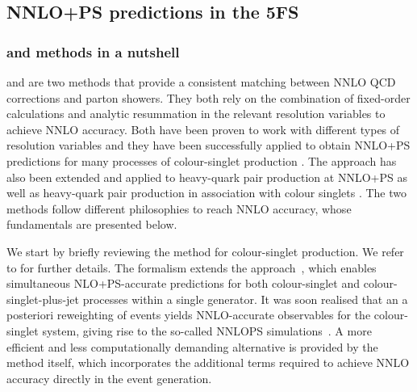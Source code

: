 \documentclass[11pt,a4paper]{article}
\begin{document}
\subsection{NNLO+PS predictions in the 5FS}\label{sec:5FSNNLOPS}
\subsubsection{\minnlo{} and \GENEVA{}  methods in a nutshell}\label{sec:nutshell}

\minnlo{} \cite{Monni:2019whf,Monni:2020nks} and \GENEVA{} \cite{Alioli:2012fc,Alioli:2013hqa} are two methods that provide a consistent matching
between NNLO QCD corrections and parton showers. They both rely on the
combination of fixed-order calculations and analytic resummation
in the relevant resolution variables to achieve NNLO accuracy.
Both have been proven to work with different types of resolution variables \cite{alioli:2021qbf,Gavardi:2023aco,Ebert:2024zdj,Gavardi:2025zpf}
and they have been successfully applied to obtain NNLO+PS predictions for many processes of colour-singlet production \cite{Lombardi:2020wju,Lombardi:2021rvg,Buonocore:2021fnj,Lombardi:2021wug,Zanoli:2021iyp,Gavardi:2022ixt,Haisch:2022nwz,Lindert:2022qdd,Niggetiedt:2024nmp,Biello:2024vdh,Alioli:2015toa,Alioli:2019qzz,Alioli:2020qrd,alioli:2021qbf,Alioli:2021egp,Alioli:2022dkj,Alioli:2023har,Gavardi:2023aco,Gavardi:2025zpf,Alioli:2025xcu}.
The \minnlo{} approach has also been extended and applied to heavy-quark pair production at NNLO+PS \cite{mazzitelli:2020jio,mazzitelli:2021mmm,Mazzitelli:2023znt}
as well as heavy-quark pair production in association with colour singlets \cite{mazzitelli:2024ura,Biello:2024pgo}.
The two methods follow different philosophies to reach NNLO accuracy, whose fundamentals are presented below.

We start by briefly reviewing the \minnlo{} method for colour-singlet production. We refer to  
for further details. The \minnlo{} formalism extends the \minlo{} approach~\cite{Hamilton:2012np,hamilton:2012rf}, which enables simultaneous NLO+PS-accurate predictions for both colour-singlet and colour-singlet-plus-jet processes within a single generator. It was soon realised that an a posteriori reweighting of \minlo{} events yields NNLO-accurate observables for the colour-singlet system, giving rise to the so-called {\sc NNLOPS} simulations~\cite{hamilton:2012rf,hamilton:2013fea,hamilton:2015nsa}. A more efficient and less computationally demanding alternative is provided by the \minnlo{} method itself, which incorporates the additional terms required to achieve NNLO accuracy directly in the event generation.
\end{document}
